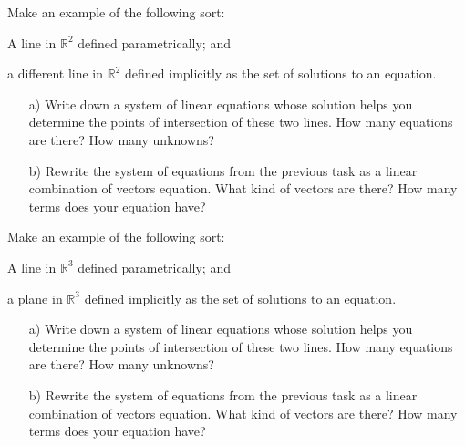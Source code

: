 \documentclass[cahier-main.tex]{subfiles}
\begin{document}
\begin{task}
Make an example of the following sort:
\begin{compactitem}
\item A line in $\mathbb{R}^2$ defined parametrically; and
\item a different line in $\mathbb{R}^2$ defined implicitly as the set of solutions to an equation.
\end{compactitem}
\begin{enumerate}
\item[a)] Write down a system of linear equations whose solution helps you determine the points of intersection of these two lines. How many equations are there? How many unknowns?

\item[b)] Rewrite the system of equations from the previous task as a linear combination of vectors equation. What kind of vectors are there? How many terms does your equation have?
\end{enumerate}
\end{task}

\begin{task}
Make an example of the following sort:
\begin{compactitem}
\item A line in $\mathbb{R}^3$ defined parametrically; and
\item a plane in $\mathbb{R}^3$ defined implicitly as the set of solutions to an equation.
\end{compactitem}
\begin{enumerate}
\item[a)] Write down a system of linear equations whose solution helps you determine the points of intersection of these two lines. How many equations are there? How many unknowns?

\item[b)] Rewrite the system of equations from the previous task as a linear combination of vectors equation. What kind of vectors are there? How many terms does your equation have?
\end{enumerate}
\end{task}
\end{document}
